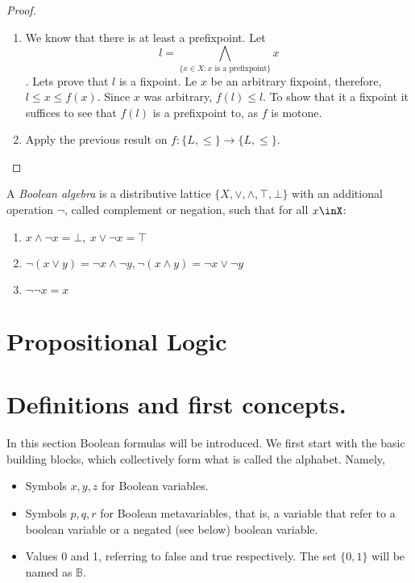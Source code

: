 \begin{definition}
\begin{proof}
  \begin{enumerate}
  \item We know that there is at least a prefixpoint. Let
    $$l = \bigwedge_{\{x\in X: x\text{ is a prefixpoint}\}} x $$. 
    Lets prove that $l$ is a fixpoint. Le $x$ be an arbitrary fixpoint, therefore, $l \le x \le f(x)$. Since $x$ was arbitrary, $f(l) \le l$. To show that it a fixpoint it suffices to see that $f(l)$ is a prefixpoint to, as $f$ is motone.
  \item Apply the previous result on $f:\{L,\le\}\to \{L,\le\}$.
  \end{enumerate}
\end{proof}
  
\begin{definition}
  A \emph{Boolean algebra} is a distributive lattice  $\{X, \vee, \wedge, \top,\bot\}$ with an additional operation $\neg$, called complement or negation, such that for all $x\inX$:
  \begin{enumerate}
  \item $ x\wedge \neg x = \bot,\ x\vee \neg x = \top $
  \item $ \neg(x \vee y) = \neg x \wedge \neg y,  \neg(x \wedge y) = \neg x \vee \neg y$
  \item $\neg \neg x = x$
  \end{enumerate}
\end{definition}
    


\section{Propositional Logic}



\section{Definitions and first concepts.}
    In this section Boolean formulas will be introduced. We first start with the basic building blocks, which collectively form what is called  the alphabet. Namely,
    \begin{itemize}
    \item Symbols $x,y,z$ for Boolean variables.
    \item Symbols $p,q,r$ for Boolean metavariables, that is, a variable that refer to a boolean variable or a negated (see below) boolean variable.
    \item Values 0 and 1, referring to false  and true respectively. The set $\{0,1\}$ will be named as $\mathbb{B}$.


\end{itemize}
\end{definition}
